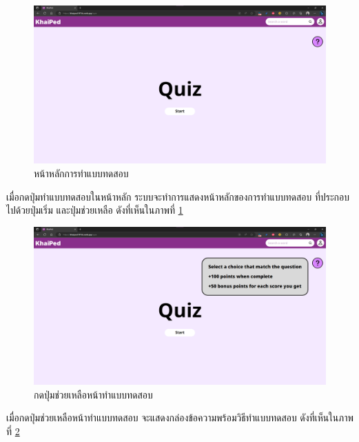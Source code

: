 \documentclass[12pt,oneside,openright,a4paper]{cpe-thai-project}
\begin{document}
\pagebreak
\begin{figure}[!h]\centering
	\includegraphics[width=\textwidth, keepaspectratio=true]{image/chap4/UI/quiz/quiz.png}
	\caption{{หน้าหลักการทำแบบทดสอบ}}\label{fig:chap4UIQuiz}
\end{figure}
\hspace{1cm}
เมื่อกดปุ่มทำแบบทดสอบในหน้าหลัก ระบบจะทำการแสดงหน้าหลักของการทำแบบทดสอบ ที่ประกอบไปด้วยปุ่มเริ่ม และปุ่มช่วยเหลือ
ดังที่เห็นในภาพที่ \ref{fig:chap4UIQuiz}

\begin{figure}[!h]\centering
	\includegraphics[width=\textwidth, keepaspectratio=true]{image/chap4/UI/quiz/help.png}
	\caption{{กดปุ่มช่วยเหลือหน้าทำแบบทดสอบ}}\label{fig:chap4UIQuizHelp}
\end{figure}
\hspace{1cm}
เมื่อกดปุ่มช่วยเหลือหน้าทำแบบทดสอบ จะแสดงกล่องข้อความพร้อมวิธีทำแบบทดสอบ ดังที่เห็นในภาพที่ \ref{fig:chap4UIQuizHelp}
\end{document}
